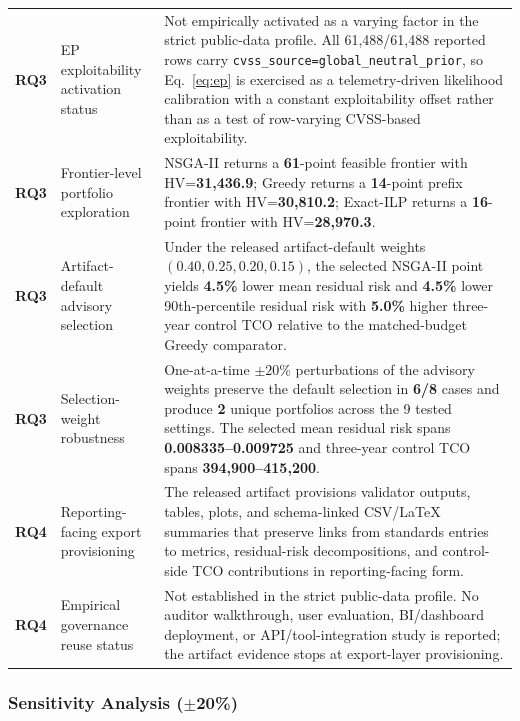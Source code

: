 \documentclass[preprint,12pt]{elsarticle}
\begin{document}
\begin{longtable}{>{\raggedright\arraybackslash}p{1.0cm}>{\raggedright\arraybackslash}p{2.7cm}>{\raggedright\arraybackslash}p{8.9cm}}
\textbf{RQ3} & EP exploitability activation status
& Not empirically activated as a varying factor in the strict public-data profile. All 61{,}488/61{,}488 reported rows carry \texttt{cvss\_source=global\_neutral\_prior}, so Eq.~\eqref{eq:ep} is exercised as a telemetry-driven likelihood calibration with a constant exploitability offset rather than as a test of row-varying CVSS-based exploitability.\\
\textbf{RQ3} & Frontier-level portfolio exploration
& NSGA-II returns a \textbf{61}-point feasible frontier with HV=\textbf{31{,}436.9}; Greedy returns a \textbf{14}-point prefix frontier with HV=\textbf{30{,}810.2}; Exact-ILP returns a \textbf{16}-point frontier with HV=\textbf{28{,}970.3}.\\
\textbf{RQ3} & Artifact-default advisory selection
& Under the released artifact-default weights $(0.40, 0.25, 0.20, 0.15)$, the selected NSGA-II point yields \textbf{4.5\%} lower mean residual risk and \textbf{4.5\%} lower 90th-percentile residual risk with \textbf{5.0\%} higher three-year control TCO relative to the matched-budget Greedy comparator.\\
\textbf{RQ3} & Selection-weight robustness
& One-at-a-time $\pm 20\%$ perturbations of the advisory weights preserve the default selection in \textbf{6/8} cases and produce \textbf{2} unique portfolios across the 9 tested settings. The selected mean residual risk spans \textbf{0.008335--0.009725} and three-year control TCO spans \textbf{394{,}900--415{,}200}.\\
\textbf{RQ4} & Reporting-facing export provisioning
& The released artifact provisions validator outputs, tables, plots, and schema-linked CSV/\LaTeX{} summaries that preserve links from standards entries to metrics, residual-risk decompositions, and control-side TCO contributions in reporting-facing form.\\
\textbf{RQ4} & Empirical governance reuse status
& Not established in the strict public-data profile. No auditor walkthrough, user evaluation, BI/dashboard deployment, or API/tool-integration study is reported; the artifact evidence stops at export-layer provisioning.\\
\end{longtable}
\endgroup

\subsubsection*{Sensitivity Analysis (\texorpdfstring{$\pm$}{\textpm}20\%)}
\end{document}
